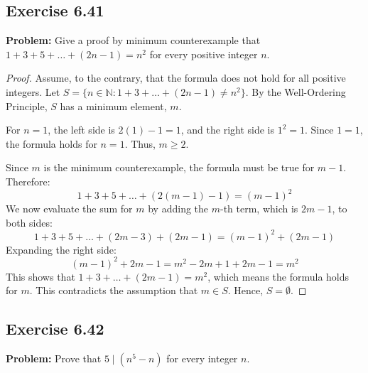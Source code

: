 \documentclass[11pt, a4paper]{article}
\theoremstyle{definition}
\theoremstyle{remark}
\newcommand{\N}{\mathbb{N}}
\begin{document}
\subsection{Exercise 6.41}
\textbf{Problem:} Give a proof by minimum counterexample that $1 + 3 + 5 + \dots + (2n - 1) = n^2$ for every positive integer $n$.

\begin{proof}
Assume, to the contrary, that the formula does not hold for all positive integers. Let $S = \{ n \in \N : 1 + 3 + \dots + (2n - 1) \neq n^2 \}$. By the Well-Ordering Principle, $S$ has a minimum element, $m$.

For $n=1$, the left side is $2(1)-1 = 1$, and the right side is $1^2 = 1$. Since $1 = 1$, the formula holds for $n=1$. Thus, $m \ge 2$.

Since $m$ is the minimum counterexample, the formula must be true for $m-1$. Therefore:
\[
1 + 3 + 5 + \dots + (2(m-1) - 1) = (m-1)^2
\]
We now evaluate the sum for $m$ by adding the $m$-th term, which is $2m - 1$, to both sides:
\[
1 + 3 + 5 + \dots + (2m - 3) + (2m - 1) = (m-1)^2 + (2m - 1)
\]
Expanding the right side:
\[
(m-1)^2 + 2m - 1 = m^2 - 2m + 1 + 2m - 1 = m^2
\]
This shows that $1 + 3 + \dots + (2m - 1) = m^2$, which means the formula holds for $m$. This contradicts the assumption that $m \in S$. Hence, $S = \emptyset$.
\end{proof}

\subsection{Exercise 6.42}
\textbf{Problem:} Prove that $5 \mid (n^5 - n)$ for every integer $n$.
\end{document}
